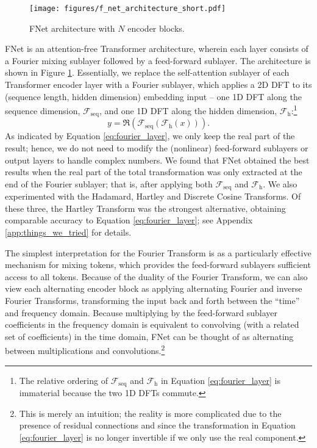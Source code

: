 \documentclass[11pt]{article}
\begin{document}
\begin{figure}
    \centering
    \texttt{[image: figures/f\_net\_architecture\_short.pdf]}
    \caption{FNet architecture with $N$ encoder blocks.}
    \label{fig:architecture}
\end{figure}

FNet is an attention-free Transformer architecture, wherein each layer consists of a Fourier mixing sublayer followed by a feed-forward sublayer. The architecture is shown in Figure \ref{fig:architecture}. Essentially, we replace the self-attention sublayer of each Transformer encoder layer with a Fourier sublayer, which applies a 2D DFT to its (sequence length, hidden dimension) embedding input -- one 1D DFT along the sequence dimension, $\mathcal{F}_{\textrm{seq}}$, and one 1D DFT along the hidden dimension, $\mathcal{F}_{\textrm{h}}$:\footnote{The relative ordering of $\mathcal{F}_{\textrm{seq}}$ and $\mathcal{F}_{\textrm{h}}$ in Equation \eqref{eq:fourier_layer} is immaterial because the two 1D DFTs commute.}
\begin{equation}
    \label{eq:fourier_layer}
    y = \Re\left(\mathcal{F}_{\textrm{seq}}\left(\mathcal{F}_{\textrm{h}} (x)\right) \right) .
\end{equation}
As indicated by Equation \eqref{eq:fourier_layer}, we only keep the real part of the result; hence, we do not need to modify the (nonlinear) feed-forward sublayers or output layers to handle complex numbers. We found that FNet obtained the best results when the real part of the total transformation was only extracted at the end of the Fourier sublayer; that is, after applying both $\mathcal{F}_{\textrm{seq}}$ and $\mathcal{F}_{\textrm{h}}$.
We also experimented with the Hadamard, Hartley and Discrete Cosine Transforms. Of these three, the Hartley Transform was the strongest alternative, obtaining comparable accuracy to Equation \eqref{eq:fourier_layer}; see Appendix \ref{app:things_we_tried} for details.

The simplest interpretation for the Fourier Transform is as a particularly effective mechanism for mixing tokens, which  provides the feed-forward sublayers sufficient access to all tokens. Because of the duality of the Fourier Transform, we can also view each alternating encoder block as applying alternating Fourier and inverse Fourier Transforms, transforming the input back and forth between the ``time'' and frequency domain. Because multiplying by the feed-forward sublayer coefficients in the frequency domain is equivalent to convolving (with a related set of coefficients) in the time domain, FNet can be thought of as alternating between multiplications and  convolutions.\footnote{This is merely an intuition; the reality is more complicated due to the presence of residual connections and since the transformation in Equation \eqref{eq:fourier_layer} is no longer invertible if we only use the real component.}
\end{document}

